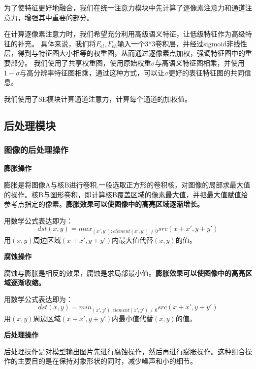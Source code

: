 \documentclass[11pt]{article}
\begin{document}
为了使特征更好地融合，我们在统一注意力模块中先计算了逐像素注意力和通道注意力，增强其中重要的部分。

在计算逐像素注意力时，我们希望充分利用高级语义特征，让低级特征作为高级特征的补充。
具体来说，我们将$F_{el},F_{eh}$输入一个3*3卷积层，并经过sigmoid非线性层，得到与特征图大小相等的权重图，从而通过逐像素点加权，强调特征图中的重要部分。
我们使用了共享权重图，使用原始权重$\sigma$与高语义特征图相乘，并使用$1-\sigma$与高分辨率特征图相乘，通过这种方式，可以让$\sigma$更好的表征特征图的共同信息。

我们使用了SE模块计算通道注意力，计算每个通道的加权值。

\subsection{后处理模块}
\subsubsection{图像的后处理操作}
\textbf{膨胀操作}

膨胀是将图像A与核B进行卷积,一般选取正方形的卷积核，对图像的局部求最大值的操作。核B与图形卷积，即计算核B覆盖区域的像素最大值，并把最大值赋值给参考点指定的像素。\textbf{膨胀效果可以使图像中的高亮区域逐渐增长。}

用数学公式表达即为：
\[
dst\left(x,y\right) = max_{\text{$(x',y'):element(x',y')\neq 0$}} src \left(x+x',y+y'\right)      
\]
用$\left(x,y\right)$周边区域$\left(x+x',y+y'\right)$内最大值代替$\left(x,y\right)$的值。



\textbf{腐蚀操作}

腐蚀与膨胀是相反的效果，腐蚀是求局部最小值。\textbf{膨胀效果可以使图像中的高亮区域逐渐收缩。}

用数学公式表达即为：
\[
dst\left(x,y\right) = min_{\text{$(x',y'):element(x',y')\neq 0$}} src \left(x+x',y+y'\right)      
\]
用$\left(x,y\right)$周边区域$\left(x+x',y+y'\right)$内最小值代替$\left(x,y\right)$的值。


\textbf{后处理操作}

后处理操作是对模型输出图片先进行腐蚀操作，然后再进行膨胀操作。这种组合操作的主要目的是在保持对象形状的同时，减少噪声和小的细节。
\end{document}
